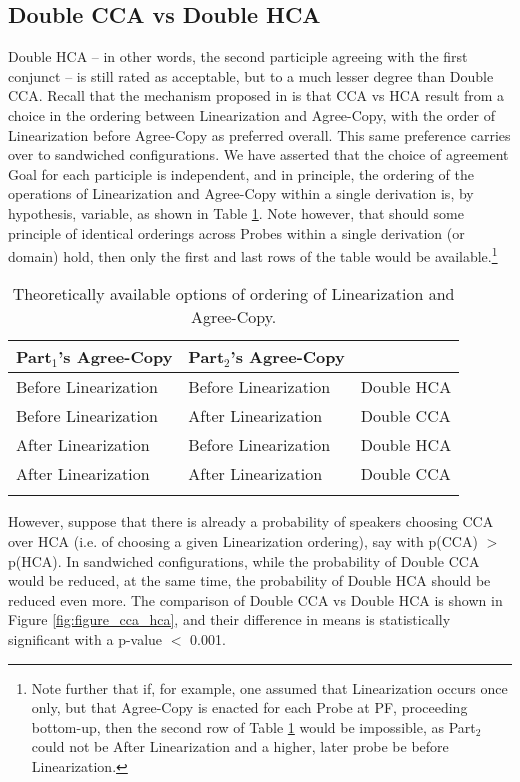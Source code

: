 \documentclass[output=paper
,modfonts
,nonflat]{langsci/langscibook}
\begin{document}
\subsection{Double CCA vs Double HCA}
Double HCA -- in other words, the second participle agreeing with the first conjunct -- is still rated as acceptable, but to a much lesser degree than Double CCA.  Recall that the mechanism proposed in \citet{marusicnevinsbadecker:15} is that CCA vs HCA result from a choice in the ordering between Linearization and Agree-Copy, with the order of Linearization before Agree-Copy as preferred overall. This same preference carries over to sandwiched configurations. We have asserted that the choice of agreement Goal for each participle is independent, and in principle, the ordering of the operations of Linearization and Agree-Copy within a single derivation is, by hypothesis, variable, as shown in Table \ref{tab:order}. Note however, that should some principle of identical orderings across Probes within a single derivation (or domain) hold, then only the first and last rows of the table would be available.\footnote{Note further that if, for example, one assumed that Linearization occurs once only, but that Agree-Copy is enacted for each Probe at PF, proceeding bottom-up, then the second row of Table \ref{tab:order} would be impossible, as Part$_2$ could not be After Linearization and a higher, later probe be before Linearization.}

\begin{table}
\begin{tabularx}{\textwidth}{lXX}
\lsptoprule
Part$_1$'s Agree-Copy &  Part$_2$'s Agree-Copy & {}\\ \midrule
Before Linearization & Before Linearization & Double HCA\\ \midrule
Before Linearization & After Linearization& Double CCA\\ \midrule
After Linearization & Before Linearization& Double HCA\\ \midrule
After Linearization & After Linearization& Double CCA\\ 
\lspbottomrule
\end{tabularx}
\caption{Theoretically available options of ordering of Linearization and Agree-Copy.}
\label{tab:order}
\end{table}
\newpage \noindent However, suppose that there is already a probability of speakers choosing CCA over HCA (i.e. of choosing a given Linearization ordering), say with p(CCA) $>$ p(HCA). In sandwiched configurations, while the probability of Double CCA would be reduced, at the same time, the probability of Double HCA should be reduced even more. 
The comparison of Double CCA vs Double HCA is shown in Figure \ref{fig:figure_cca_hca}, and their difference in means is statistically significant with a p-value $<$ 0.001.
\end{document}
